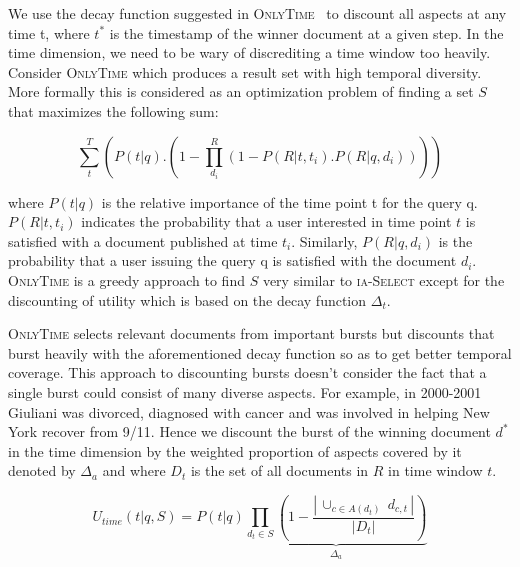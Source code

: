 
We use the decay function suggested in \textsc{OnlyTime}~\cite{lm+t+d} to discount all aspects at any time t, where $t^*$ is the timestamp of the winner document at a given step. In the time dimension, we need to be wary of discrediting a time window too heavily. Consider \textsc{OnlyTime} which produces a result set with high temporal diversity. More formally this is considered as an optimization problem of finding a set $S$that maximizes the following sum:

\begin{equation}
 \sum_{t}^{T}\left ( P(t | q).(1-\prod_{d_{i}}^{R} (1-P(R|t,t_{i}).P(R|q,d_{i}))) \right )
\end{equation}

where $P(t|q)$ is the relative importance of the time point t for the query q. $P(R|t, t_i)$ indicates the probability that a user interested in time point $t$ is satisfied with a document published at time $t_i$. Similarly, $P(R|q, d_i)$ is the probability that a user issuing the query q is satisfied with the document $d_i$. \textsc{OnlyTime} is a greedy approach to find $S$ very similar to \textsc{ia-Select} except for the discounting of utility which is based on the decay function $\Delta_t$.

\textsc{OnlyTime} selects relevant documents from important bursts but discounts that burst heavily with the aforementioned decay function so as to get better temporal coverage. This approach to discounting bursts doesn't consider the fact that a single burst could consist of many diverse aspects. For example, in 2000-2001 Giuliani was divorced, diagnosed with cancer and was involved in helping New York recover from 9/11. Hence we discount the burst of the winning document $d^*$ in the time dimension by the weighted proportion of aspects covered by it denoted by $\Delta_a$ and where $D_{t}$ is the set of all documents in $R$ in time window $t$.


\begin{equation}
	U_{time}(t|q,S) = P(t|q)  \underbrace{\prod_{d_t \in S} \left ( 1 - \frac{|\, \cup_{ c \in A(d_t) } \: d_{c,t}\,|}{|D_{t}|} \right )}_{\Delta_a}
\end{equation}


